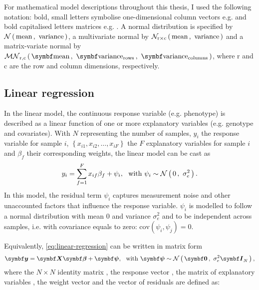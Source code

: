 For mathematical model descriptions throughout this thesis, I used the following notation: bold, small letters symbolise one-dimensional column vectors e.g.  and bold capitalised letters matrices e.g. . A normal distribution is specified by \(\mathcal{N}\left(\,{\text{mean}}\,,~{\text{variance}}\,\right)\), a multivariate normal by \(\mathcal{N}_{\text{r}\times \text{c}}\left(\, {\text{mean}} \,,~{\text{variance}} \,\right)\) and a matrix-variate normal by  \(\matrixnormal {\text{r}} {\text{c}}{\text{mean}}{\text{variance}_\text{rows}}{\text{variance}_{\text{columns}}}\), where r and c are the row and column dimensions, respectively.

\subsection{Linear regression}
In the linear model, the continuous response variable (e.g. phenotype) is described as a linear function of one or more explanatory variables (e.g. genotype and covariates). With \(N\) representing the number of samples, \(y_i\) the response variable for sample \(i\), \(\left\{x_{i1}, x_{i2}, \dots, x_{iF}\right\}\)  the \(F\) explanatory variables for sample \(i\) and \(\beta_{f}\) their corresponding weights, the linear model can be cast as
\begin{equation}
y_i = \sum^{F}_{f=1}x_{if}\beta_{f} + \psi_i, \,\,\,\, \text{with }  \psi_i \sim \mathcal{N}\left(\,{0}\,,~{\sigma^2_e}\,\right).
\label{eq:linear-regression}
\end{equation}
%
In this model, the residual term \(\psi_i\) captures measurement noise and other unaccounted factors that influence the response variable. \(\psi_i\) is modelled to follow a normal distribution with mean 0 and variance \(\sigma^2_e\) and to be independent across 
samples, i.e. with covariance equals to zero: \(\text{cov}\left(\psi_i,\psi_j\right)=0\).

Equivalently, \cref{eq:linear-regression} can be written in matrix form
\begin{equation}
\mat{y} = \mat{X}\mat{\beta} + \mat{\psi}, \,\,\,\, \text{with }  \mat{\psi} \sim  \normal {\mat{0}}{\sigma^2_e\matsub{I}{N}},
\label{eq:linear-regression-matrix}
\end{equation}
%
where the \(N \times N\) identity matrix , the response vector , the matrix of explanatory variables , the weight vector \tmat{\beta} and the vector of residuals \tmat{\psi} are defined as:

